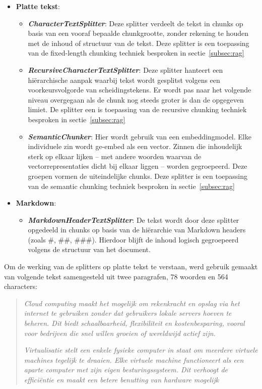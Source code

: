 \begin{itemize}
    \item \textbf{Platte tekst}: \begin{itemize}
        \item \textbf{\emph{CharacterTextSplitter}}: Deze splitter verdeelt de tekst in chunks op basis van een vooraf bepaalde chunkgrootte, zonder rekening te houden met de inhoud of structuur van de tekst. Deze splitter is een toepassing van de fixed-length chunking techniek besproken in sectie~\ref{subsec:rag}
        \item \textbf{\emph{RecursiveCharacterTextSplitter}}: Deze splitter hanteert een hiërarchische aanpak waarbij tekst wordt gesplitst volgens een voorkeursvolgorde van scheidingstekens. Er wordt pas naar het volgende niveau overgegaan als de chunk nog steeds groter is dan de opgegeven limiet. De splitter een is toepassing van de recursive chunking techniek besproken in sectie~\ref{subsec:rag}
        \item \textbf{\emph{SemanticChunker}}: Hier wordt gebruik van een embeddingmodel. Elke individuele zin wordt ge-embed als een vector. Zinnen die inhoudelijk sterk op elkaar lijken -- met andere woorden waarvan de vectorrepresentaties dicht bij elkaar liggen -- worden gegroepeerd. Deze groepen vormen de uiteindelijke chunks. Deze splitter is een toepassing van de semantic chunking techniek besproken in sectie~\ref{subsec:rag}
    \end{itemize}
    \item \textbf{Markdown}: \begin{itemize}
        \item \textbf{\emph{MarkdownHeaderTextSplitter}}: De tekst wordt door deze splitter opgedeeld in chunks op basis van de hiërarchie van Markdown headers (zoals \#, \#\#, \#\#\#). Hierdoor blijft de inhoud logisch gegroepeerd volgens de structuur van het document.
    \end{itemize}
\end{itemize}

Om de werking van de splitters op platte tekst te verstaan, werd gebruik gemaakt van volgende tekst samengesteld uit twee paragrafen, 78 woorden en 564 characters:

\begin{quote}
    \emph{Cloud computing maakt het mogelijk om rekenkracht en opslag via het internet te gebruiken zonder dat gebruikers lokale servers hoeven te beheren. Dit biedt schaalbaarheid, flexibiliteit en kostenbesparing, vooral voor bedrijven die snel willen groeien of wereldwijd actief zijn.} 
    
    \emph{Virtualisatie stelt een enkele fysieke computer in staat om meerdere virtuele machines tegelijk te draaien. Elke virtuele machine functioneert als een aparte computer met zijn eigen besturingssysteem. Dit verhoogt de efficiëntie en maakt een betere benutting van hardware mogelijk}
\end{quote}

